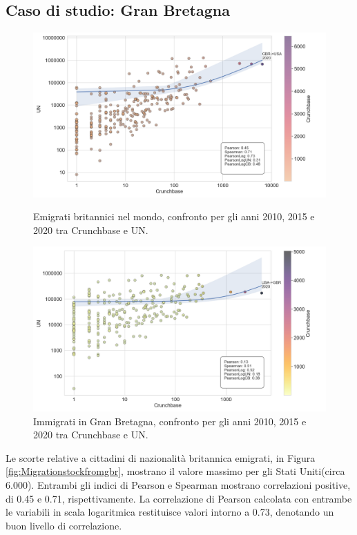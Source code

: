 \subsection{Caso di studio: Gran Bretagna}
\label{gbrstock}
\begin{figure}[tbp]
  \centering
  \begin{minipage}[t]{1\textwidth}
    \includegraphics[width=\textwidth]{images/Migration_Stocks/GBR/Migration Stocks from GBR.png}
    \caption{Emigrati britannici nel mondo, confronto per gli anni 2010, 2015 e 2020 tra Crunchbase e UN.}
    \label{fig:Migrationstockfromgbr}
  \end{minipage}
  \begin{minipage}[b]{1\textwidth}
    \includegraphics[width=\textwidth]{images/Migration_Stocks/GBR/Migration Stocks to GBR.png}
    \caption{Immigrati in Gran Bretagna, confronto per gli anni 2010, 2015 e 2020 tra Crunchbase e UN.}
    \label{fig:Migrationstocktogbr}
  \end{minipage}
\end{figure}

Le scorte relative a cittadini di nazionalità britannica emigrati, in Figura \ref{fig:Migrationstockfromgbr}, mostrano il valore massimo per gli Stati Uniti(circa 6.000). 
Entrambi gli indici di Pearson e Spearman mostrano correlazioni positive, di 0.45 e 0.71, rispettivamente.
La correlazione di Pearson calcolata con entrambe le variabili in scala logaritmica restituisce valori intorno a 0.73, denotando un buon livello di correlazione.

